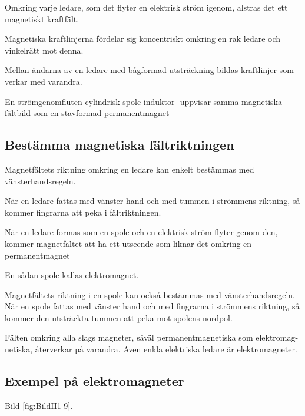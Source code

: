 Omkring varje ledare, som det flyter en elektrisk ström igenom, alstras det ett
magnetiskt kraftfält.

Magnetiska kraftlinjerna fördelar sig koncentriskt omkring en rak ledare och vinkelrätt
mot denna.

Mellan ändarna av en ledare med bågformad utsträckning bildas kraftlinjer som verkar med
varandra.

En strömgenomfluten cylindrisk spole induktor- uppvisar samma magnetiska fältbild som en stavformad permanentmagnet

\subsection{Bestämma magnetiska fältriktningen}

Magnetfältets riktning omkring en ledare kan enkelt bestämmas med vänsterhandsregeln.

När en ledare fattas med vänster hand och med tummen i strömmens riktning, så
kommer fingrarna att peka i fältriktningen.

När en ledare formas som en spole och en elektrisk ström flyter genom den, kommer
magnetfältet att ha ett utseende som liknar det omkring en permanentmagnet

En sådan spole kallas elektromagnet.

Magnetfältets riktning i en spole kan också bestämmas med vänsterhandsregeln.
När en spole fattas med vänster hand och med fingrarna i strömmens riktning, så
kommer den utsträckta tummen att peka mot spolens nordpol.

Fälten omkring alla slags magneter, såväl permanentmagnetiska som elektromag-
netiska, återverkar på varandra. Aven enkla
elektriska ledare är elektromagneter.

\subsection{Exempel på elektromagneter}

Bild \ref{fig:BildII1-9}.

